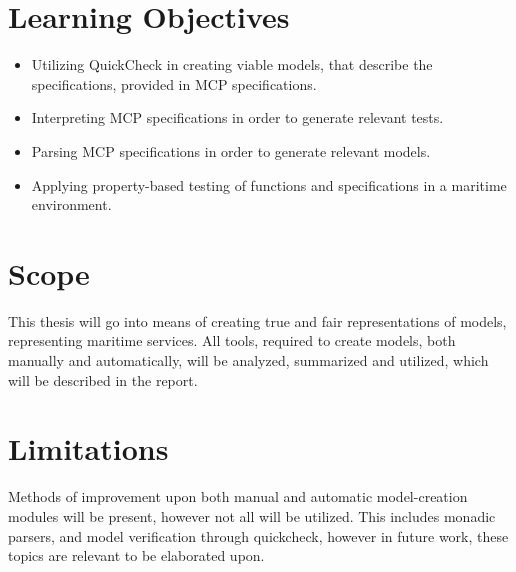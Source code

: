 \section{Learning Objectives}

\begin{itemize}
  \item Utilizing QuickCheck in creating viable models, that describe the specifications, provided in MCP specifications.
  \item Interpreting MCP specifications in order to generate relevant tests.
  \item Parsing MCP specifications in order to generate relevant models.
  \item Applying property-based testing of functions and specifications in a maritime environment.
\end{itemize}

\section{Scope}
This thesis will go into means of creating true and fair representations of models, representing maritime services. All tools, required to create models, both manually and automatically, will be analyzed, summarized and utilized, which will be described in the report.

\section{Limitations}
Methods of improvement upon both manual and automatic model-creation modules will be present, however not all will be utilized. This includes monadic parsers, and model verification through quickcheck, however in future work, these topics are relevant to be elaborated upon.

